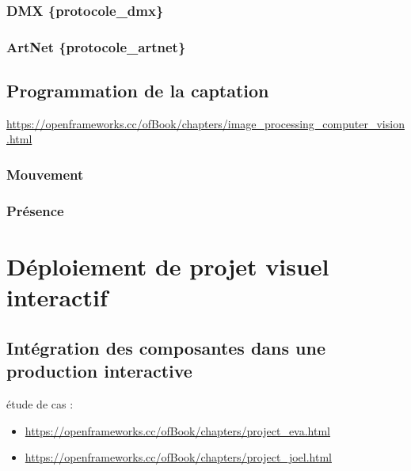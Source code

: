 \documentclass[
]{book}
\begin{document}
\hypertarget{dmx-protocole_dmx}{%
\subsection{DMX \{protocole\_dmx\}}\label{dmx-protocole_dmx}}

\hypertarget{artnet-protocole_artnet}{%
\subsection{ArtNet \{protocole\_artnet\}}\label{artnet-protocole_artnet}}

\hypertarget{interagir_video}{%
\section{Programmation de la captation}\label{interagir_video}}

\url{https://openframeworks.cc/ofBook/chapters/image_processing_computer_vision.html}

\hypertarget{interagir_mouvement}{%
\subsection{Mouvement}\label{interagir_mouvement}}

\hypertarget{interagir_presence}{%
\subsection{Présence}\label{interagir_presence}}

\hypertarget{deployer}{%
\chapter{Déploiement de projet visuel interactif}\label{deployer}}

\hypertarget{intuxe9gration-des-composantes-dans-une-production-interactive}{%
\section{Intégration des composantes dans une production interactive}\label{intuxe9gration-des-composantes-dans-une-production-interactive}}

étude de cas :

\begin{itemize}
\item
  \url{https://openframeworks.cc/ofBook/chapters/project_eva.html}
\item
  \url{https://openframeworks.cc/ofBook/chapters/project_joel.html}
\end{itemize}
\end{document}
